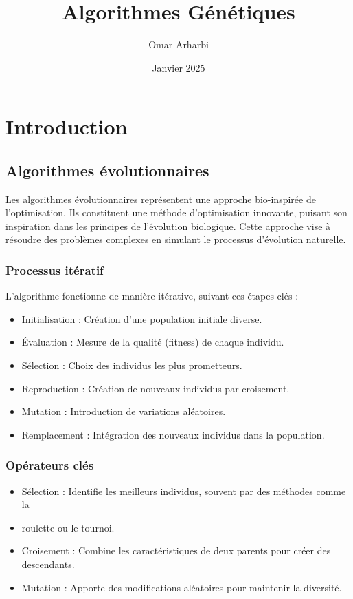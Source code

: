 \documentclass{article}
\title{Algorithmes Génétiques}
\author{Omar Arharbi}
\date{Janvier 2025}
\begin{document}
\maketitle

\tableofcontents  %
\newpage  %

\section{Introduction}
\subsection{Algorithmes évolutionnaires}

Les algorithmes évolutionnaires représentent une approche bio-inspirée de l'optimisation. Ils constituent une méthode d'optimisation innovante, puisant son inspiration dans les principes de l'évolution biologique. Cette approche vise à résoudre des problèmes complexes en simulant le processus d'évolution naturelle.

\subsubsection{Processus itératif}

L'algorithme fonctionne de manière itérative, suivant ces étapes clés :

\begin{itemize}
    \item Initialisation : Création d'une population initiale diverse.
    \item Évaluation : Mesure de la qualité (fitness) de chaque individu.
    \item Sélection : Choix des individus les plus prometteurs.
    \item Reproduction : Création de nouveaux individus par croisement.
    \item Mutation : Introduction de variations aléatoires.
    \item Remplacement : Intégration des nouveaux individus dans la population.
\end{itemize}

\subsubsection{Opérateurs clés}
\begin{itemize}
    \item Sélection : Identifie les meilleurs individus, souvent par des méthodes comme la \item roulette ou le tournoi.
    \item Croisement : Combine les caractéristiques de deux parents pour créer des descendants.
    \item Mutation : Apporte des modifications aléatoires pour maintenir la diversité.
\end{itemize}
\end{document}
